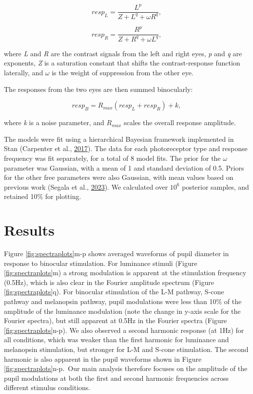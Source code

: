 \documentclass[
]{article}
\begin{document}
\begin{equation}
\label{eq:respL}
resp_L = \frac{L^p}{Z + L^q + \omega R^q},
\end{equation}

\begin{equation}
\label{eq:respR}
resp_R = \frac{R^p}{Z + R^q + \omega L^q},
\end{equation}

\noindent where \emph{L} and \emph{R} are the contrast signals from the left and right eyes, \emph{p} and \emph{q} are exponents, \emph{Z} is a saturation constant that shifts the contrast-response function laterally, and \(\omega\) is the weight of suppression from the other eye.

The responses from the two eyes are then summed binocularly:

\begin{equation}
\label{eq:respB}
resp_B = R_{max}(resp_L + resp_R) + k,
\end{equation}

\noindent where \emph{k} is a noise parameter, and \(R_{max}\) scales the overall response amplitude.

The models were fit using a hierarchical Bayesian framework implemented in Stan (Carpenter et al., \protect\hyperlink{ref-Carpenter2017}{2017}). The data for each photoreceptor type and response frequency was fit separately, for a total of 8 model fits. The prior for the \(\omega\) parameter was Gaussian, with a mean of 1 and standard deviation of 0.5. Priors for the other free parameters were also Gaussian, with mean values based on previous work (Segala et al., \protect\hyperlink{ref-Segala2023}{2023}). We calculated over \ensuremath{10^{6}} posterior samples, and retained 10\% for plotting.

\hypertarget{results}{%
\section{Results}\label{results}}

Figure \ref{fig:spectraplots}m-p shows averaged waveforms of pupil diameter in response to binocular stimulation. For luminance stimuli (Figure \ref{fig:spectraplots}m) a strong modulation is apparent at the stimulation frequency (0.5Hz), which is also clear in the Fourier amplitude spectrum (Figure \ref{fig:spectraplots}q). For binocular stimulation of the L-M pathway, S-cone pathway and melanopsin pathway, pupil modulations were less than 10\% of the amplitude of the luminance modulation (note the change in y-axis scale for the Fourier spectra), but still apparent at 0.5Hz in the Fourier spectra (Figure \ref{fig:spectraplots}n-p). We also observed a second harmonic response (at 1Hz) for all conditions, which was weaker than the first harmonic for luminance and melanopsin stimulation, but stronger for L-M and S-cone stimulation. The second harmonic is also apparent in the pupil waveforms shown in Figure \ref{fig:spectraplots}n-p.~Our main analysis therefore focuses on the amplitude of the pupil modulations at both the first and second harmonic frequencies across different stimulus conditions.
\end{document}
